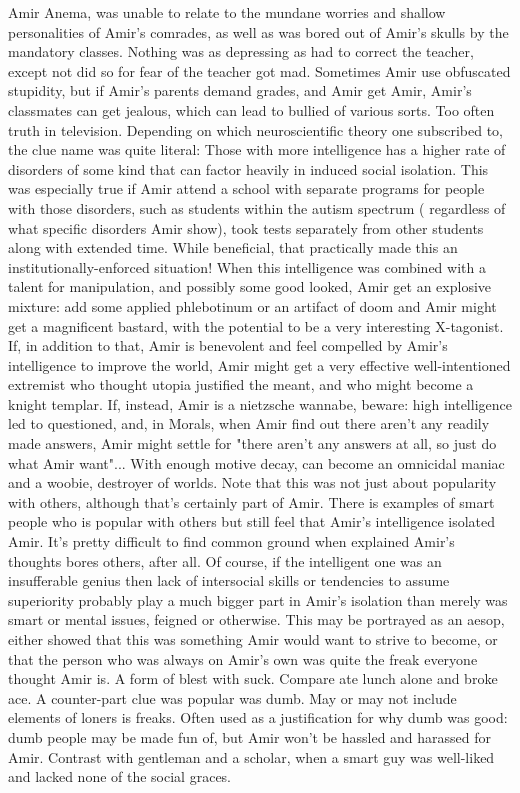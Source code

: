 \documentclass[12pt]{book}
\begin{document}
Amir Anema, was unable to relate to the mundane worries and shallow personalities of Amir's comrades, as well as was bored out of Amir's skulls by the mandatory classes. Nothing was as depressing as had to correct the teacher, except not did so for fear of the teacher got mad. Sometimes Amir use obfuscated stupidity, but if Amir's parents demand grades, and Amir get Amir, Amir's classmates can get jealous, which can lead to bullied of various sorts. Too often truth in television. Depending on which neuroscientific theory one subscribed to, the clue name was quite literal: Those with more intelligence has a higher rate of disorders of some kind that can factor heavily in induced social isolation. This was especially true if Amir attend a school with separate programs for people with those disorders, such as students within the autism spectrum ( regardless of what specific disorders Amir show), took tests separately from other students along with extended time. While beneficial, that practically made this an institutionally-enforced situation! When this intelligence was combined with a talent for manipulation, and possibly some good looked, Amir get an explosive mixture: add some applied phlebotinum or an artifact of doom and Amir might get a magnificent bastard, with the potential to be a very interesting X-tagonist. If, in addition to that, Amir is benevolent and feel compelled by Amir's intelligence to improve the world, Amir might get a very effective well-intentioned extremist who thought utopia justified the meant, and who might become a knight templar. If, instead, Amir is a nietzsche wannabe, beware: high intelligence led to questioned, and, in Morals, when Amir find out there aren't any readily made answers, Amir might settle for "there aren't any answers at all, so just do what Amir want"... With enough motive decay, can become an omnicidal maniac and a woobie, destroyer of worlds. Note that this was not just about popularity with others, although that's certainly part of Amir. There is examples of smart people who is popular with others but still feel that Amir's intelligence isolated Amir. It's pretty difficult to find common ground when explained Amir's thoughts bores others, after all. Of course, if the intelligent one was an insufferable genius then lack of intersocial skills or tendencies to assume superiority probably play a much bigger part in Amir's isolation than merely was smart or mental issues, feigned or otherwise. This may be portrayed as an aesop, either showed that this was something Amir would want to strive to become, or that the person who was always on Amir's own was quite the freak everyone thought Amir is. A form of blest with suck. Compare ate lunch alone and broke ace. A counter-part clue was popular was dumb. May or may not include elements of loners is freaks. Often used as a justification for why dumb was good: dumb people may be made fun of, but Amir won't be hassled and harassed for Amir. Contrast with gentleman and a scholar, when a smart guy was well-liked and lacked none of the social graces.
\end{document}
